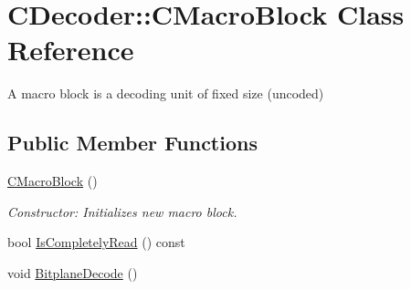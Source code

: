 \hypertarget{classCDecoder_1_1CMacroBlock}{}\section{C\+Decoder\+::C\+Macro\+Block Class Reference}
\label{classCDecoder_1_1CMacroBlock}


A macro block is a decoding unit of fixed size (uncoded)  


\subsection*{Public Member Functions}
\begin{DoxyCompactItemize}
\item 
\mbox{\hyperlink{classCDecoder_1_1CMacroBlock_aca6c25f512f637244f971e21f813f433}{C\+Macro\+Block}} ()
\begin{DoxyCompactList}\small\item\em Constructor\+: Initializes new macro block. \end{DoxyCompactList}\item 
bool \mbox{\hyperlink{classCDecoder_1_1CMacroBlock_a0425cb162ca41e04f6ae0886a62b3cc9}{Is\+Completely\+Read}} () const
\item 
void \mbox{\hyperlink{classCDecoder_1_1CMacroBlock_a72899e368b29833bd485c4858b5ad7ef}{Bitplane\+Decode}} ()
\end{DoxyCompactItemize}
